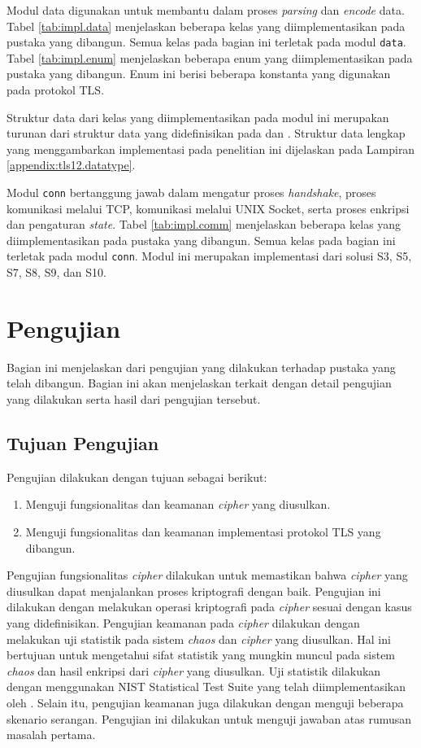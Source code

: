 Modul data digunakan untuk membantu dalam proses \emph{parsing} dan \emph{encode} data. Tabel \ref{tab:impl.data} menjelaskan beberapa kelas yang diimplementasikan pada pustaka yang dibangun. Semua kelas pada bagian ini terletak pada modul \texttt{data}. Tabel \ref{tab:impl.enum} menjelaskan beberapa enum yang diimplementasikan pada pustaka yang dibangun. Enum ini berisi beberapa konstanta yang digunakan pada protokol TLS.

Struktur data dari kelas yang diimplementasikan pada modul ini merupakan turunan dari struktur data yang didefinisikan pada \textcite{rfc5246} dan \textcite{rfc4492}. Struktur data lengkap yang menggambarkan implementasi pada penelitian ini dijelaskan pada Lampiran \ref{appendix:tls12.datatype}.

Modul \texttt{conn} bertanggung jawab dalam mengatur proses \emph{handshake}, proses komunikasi melalui TCP, komunikasi melalui UNIX Socket, serta proses enkripsi dan pengaturan \emph{state}. Tabel \ref{tab:impl.comm} menjelaskan beberapa kelas yang diimplementasikan pada pustaka yang dibangun. Semua kelas pada bagian ini terletak pada modul \texttt{conn}. Modul ini merupakan implementasi dari solusi S3, S5, S7, S8, S9, dan S10.

\section{Pengujian}
Bagian ini menjelaskan dari pengujian yang dilakukan terhadap pustaka yang telah dibangun. Bagian ini akan menjelaskan terkait dengan detail pengujian yang dilakukan serta hasil dari pengujian tersebut.

\subsection{Tujuan Pengujian}
Pengujian dilakukan dengan tujuan sebagai berikut:
\begin{enumerate}
  \item Menguji fungsionalitas dan keamanan \emph{cipher} yang diusulkan.
  \item Menguji fungsionalitas dan keamanan implementasi protokol TLS yang dibangun.
\end{enumerate}

Pengujian fungsionalitas \emph{cipher} dilakukan untuk memastikan bahwa \emph{cipher} yang diusulkan dapat menjalankan proses kriptografi dengan baik. Pengujian ini dilakukan dengan melakukan operasi kriptografi pada \emph{cipher} sesuai dengan kasus yang didefinisikan. Pengujian keamanan pada \emph{cipher} dilakukan dengan melakukan uji statistik pada sistem \emph{chaos} dan \emph{cipher} yang diusulkan. Hal ini bertujuan untuk mengetahui sifat statistik yang mungkin muncul pada sistem \emph{chaos} dan hasil enkripsi dari \emph{cipher} yang diusulkan. Uji statistik dilakukan dengan menggunakan NIST Statistical Test Suite yang telah diimplementasikan oleh \textcite{marek2016}. Selain itu, pengujian keamanan juga dilakukan dengan menguji beberapa skenario serangan. Pengujian ini dilakukan untuk menguji jawaban atas rumusan masalah pertama.

